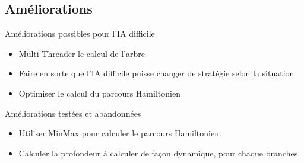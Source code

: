 \documentclass{beamer}
\begin{document}
\subsection{Améliorations}
\begin{frame}{}
\begin{block}{Améliorations possibles pour l'IA difficile}
\begin{itemize}
 \item<1-> Multi-Threader le calcul de l’arbre
 \item<2-> Faire en sorte que l’IA difficile puisse changer de stratégie selon la situation
 \item<3-> Optimiser le calcul du parcours Hamiltonien
\end{itemize}
\end{block}
\end{frame}

\begin{frame}{}
\begin{block}{Améliorations testées et abandonnées}
\begin{itemize}
 \item<1-> Utiliser MinMax pour calculer le parcours Hamiltonien. 
 \item<2-> Calculer la profondeur à calculer de façon dynamique, pour chaque branches.
\end{itemize}
\end{block}
\end{frame}
\end{document}
